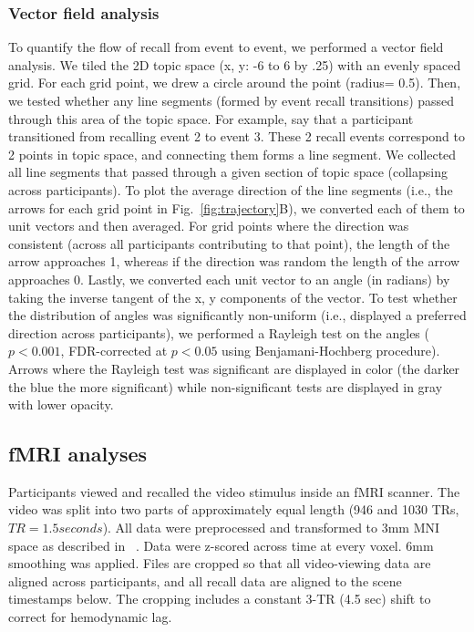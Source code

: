 \documentclass{article}
\begin{document}
\subsubsection*{Vector field analysis}
To quantify the flow of recall from event to event, we performed a vector field analysis.  We tiled the 2D topic space (x, y: -6 to 6 by .25) with an evenly spaced grid. For each grid point, we drew a circle around the point (radius= 0.5). Then, we tested whether any line segments (formed by event recall transitions) passed through this area of the topic space.  For example, say that a participant transitioned from recalling event 2 to event 3. These 2 recall events correspond to 2 points in topic space, and connecting them forms a line segment. We collected all line segments that passed through a given section of topic space (collapsing across participants). To plot the average direction of the line segments (i.e., the arrows for each grid point in Fig.~\ref{fig:trajectory}B), we converted each of them to unit vectors and then averaged. For grid points where the direction was consistent (across all participants contributing to that point), the length of the arrow approaches 1, whereas if the direction was random the length of the arrow approaches 0. Lastly, we converted each unit vector to an angle (in radians) by taking the inverse tangent of the x, y components of the vector. To test whether the distribution of angles was significantly non-uniform (i.e., displayed a preferred direction across participants), we performed a Rayleigh test on the angles ($p < 0.001$, FDR-corrected at $p < 0.05$ using Benjamani-Hochberg procedure). Arrows where the Rayleigh test was significant are displayed in color (the darker the blue the more significant) while non-significant tests are displayed in gray with lower opacity.

\subsection*{fMRI analyses}
Participants viewed and recalled the video stimulus inside an fMRI scanner. The video was split into two parts of approximately equal length (946 and 1030 TRs, $TR=1.5 seconds$). All data were preprocessed and transformed to 3mm MNI space as described in ~\citep{ChenEtal17}. Data were z-scored across time at every voxel. 6mm smoothing was applied.
Files are cropped so that all video-viewing data are aligned across participants, and all recall data are aligned to the scene timestamps below. The cropping includes a constant 3-TR (4.5 sec) shift to correct for hemodynamic lag.
\end{document}
